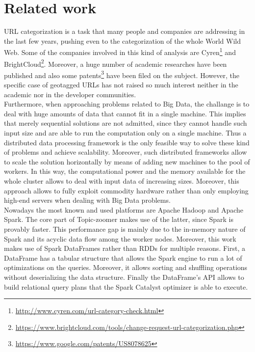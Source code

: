 \documentclass{sig-alternate-05-2015}
\begin{document}
\section{Related work}
URL categorization is a task that many people and companies are addressing in the last few years, pushing even to the categorization of the whole World Wild Web. Some of the companies involved in this kind of analysis are Cyren\footnote{\url{http://www.cyren.com/url-category-check.html}} and BrightCloud\footnote{\url{https://www.brightcloud.com/tools/change-request-url-categorization.php}}. Moreover, a huge number of academic researches have been published and also some patents\footnote{\url{https://www.google.com/patents/US8078625}} have been filed on the subject. However, the specific case of geotagged URLs has not raised so much interest neither in the academic nor in the developer communities.\\
Furthermore, when approaching problems related to Big Data, the challange is to deal with huge amounts of data that cannot fit in a single machine. This implies that merely sequential solutions are not admitted, since they cannot handle such input size and are able to run the computation only on a single machine. Thus a distributed data processing framework is the only feasible way to solve these kind of problems and achieve scalability\cite{scalability_performances}. Moreover, such distributed frameworks allow to scale the solution horizontally by means of adding new machines to the pool of workers. In this way, the computational power and the memory available for the whole cluster allows to deal with input data of increasing sizes. Moreover, this approach allows to fully exploit commodity hardware rather than only employing high-end servers when dealing with Big Data problems.\\
Nowadays the most known and used platforms are Apache Hadoop and Apache Spark. The core part of Topic-zoomer makes use of the latter, since Spark is provably faster\cite{evaluation, evaluation2}. This performance gap is mainly due to the in-memory nature of Spark and its acyclic data flow among the worker nodes. Moreover, this work makes use of Spark DataFrames rather than RDDs for multiple reasons. First, a DataFrame has a tabular structure that allows the Spark engine to run a lot of optimizations on the queries. Moreover, it allows sorting and shuffling operations without deserializing the data structure. Finally the DataFrame's API allows to build relational query plans\cite{relational_query} that the Spark Catalyst optimizer is able to execute.
\end{document}
